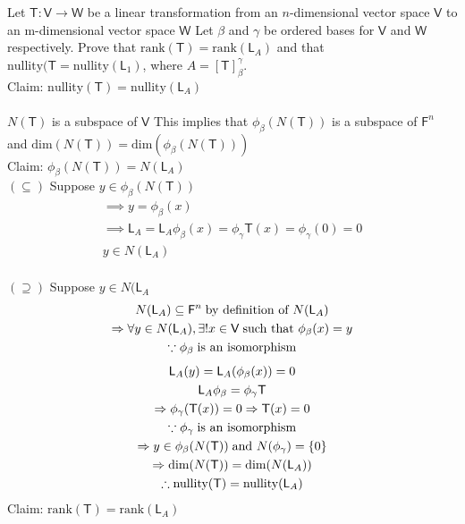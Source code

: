 Let $\mathsf{T}\colon\mathsf{V}\to\mathsf{W}$ be a linear
transformation from an $n$-dimensional vector space $\mathsf{V}$ to an
m-dimensional vector space $\mathsf{W}$  Let $\beta$ and $\gamma$ be
ordered bases for $\mathsf{V}$ and $\mathsf{W}$ respectively. Prove
that $\text{rank}(\mathsf{T}) = \text{rank}(\mathsf{L}_A)$ and that
$\text{nullity}(\mathsf{T} = \text{nullity}(\mathsf{L}_1)$, where $A = [\mathsf{T}]^\gamma_\beta$.
\\Claim: $\text{nullity}(\mathsf{T}) = \text{nullity}(\mathsf{L}_A)$
\paragraph{}$N(\mathsf{T})$ is a subspace of $\mathsf{V}$ This implies
that $\phi_\beta(N(\mathsf{T}))$ is a subspace of $\mathsf{F}^n$ and
$\text{dim}(N(\mathsf{T})) = \text{dim}(\phi_\beta(N(\mathsf{T})))$
\\Claim: $\phi_\beta(N(\mathsf{T})) = N(\mathsf{L}_A)$
\\$(\subseteq)$ Suppose $y \in \phi_\beta(N(\mathsf{T}))$
\begin{gather}
\implies y = \phi_\beta(x)\\
\implies \mathsf{L}_A = \mathsf{L}_A\phi_\beta(x) =
\phi_\gamma\mathsf{T}(x) = \phi_\gamma(0) =0 \\
y \in N(\mathsf{L}_A)
\end{gather}
\\$(\supseteq)$ Suppose $y \in N(\mathsf{L}_A$
\begin{gather}
N(\mathsf{L}_A) \subseteq \mathsf{F}^n\;\text{by definition of }
N(\mathsf{L}_A)\\
\implies \forall y \in N(\mathsf{L}_A), \exists ! x\in \mathsf{V}
\;\text{such that } \phi_\beta(x) = y\\
\notag \because \phi_\beta\; \text{is an isomorphism}
\end{gather}
\begin{gather}
\mathsf{L}_A(y) = \mathsf{L}_A(\phi_\beta(x)) =0 \\
\mathsf{L}_A\phi_\beta = \phi_\gamma\mathsf{T}\\
\implies \phi_\gamma(\mathsf{T}(x)) = 0
\implies \mathsf{T}(x) =0 \\
\notag \because \phi_\gamma\; \text{is an isomorphism}\\
\implies y \in \phi_\beta(N(\mathsf{T}))\;\text{and } N(\phi_\gamma) =
\{0\}\\
\implies \text{dim}(N(\mathsf{T})) = \text{dim}(N(\mathsf{L}_A))\\
\therefore \text{nullity}(\mathsf{T}) = \text{nullity}(\mathsf{L}_A)
\end{gather}
\newpage{}
Claim: $\text{rank}(\mathsf{T}) = \text{rank}(\mathsf{L}_A)$
